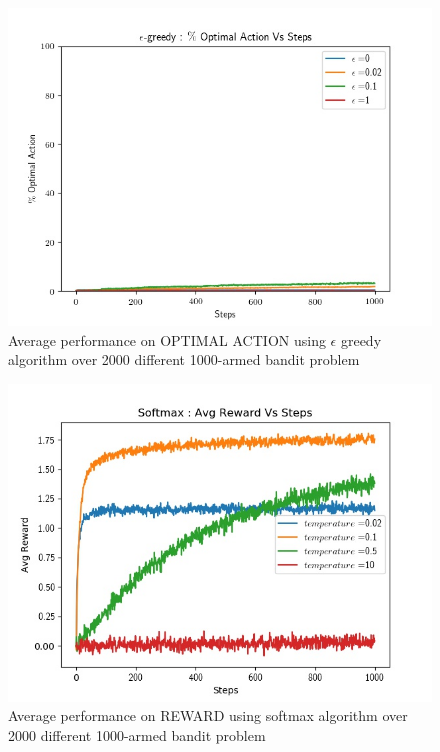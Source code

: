 \documentclass[preprint,12pt]{elsarticle}
\begin{document}
	 
	 \begin{figure}[H]
	 	\centering
	 	\includegraphics[scale=0.7]{./optimal_epsilon_1000.jpg}
	 	\hspace{0.25cm}
	 	\caption{Average performance on OPTIMAL ACTION using $\epsilon$ greedy algorithm over 2000 different 1000-armed bandit problem}
	 	\label{fig2:greedy_opt_1000}
	 \end{figure}
	
	 \begin{figure}[H]
		 	\centering
		 	\includegraphics[scale=0.7]{./reward_soft_1000.jpg}
		 	\hspace{0.25cm}
		 	\caption{Average performance on REWARD using softmax algorithm over 2000 different 1000-armed bandit problem}
		 	\label{fig1:soft_raw_1000}
	 \end{figure}
	 
\end{document}
